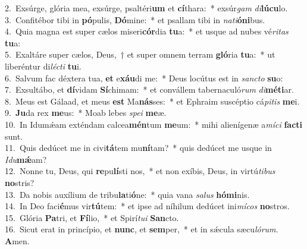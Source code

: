 {2.~}Exsúrge, glória mea, exsúrge, psaltéri\textbf{um} et \textbf{cí}thara:~* exsúr\textit{gam} \textit{di}\textbf{lú}\textbf{cu}lo.\\
{3.~}Confitébor tibi in \textbf{pó}pulis, \textbf{Dó}mine:~* et psallam tibi in \textit{na}\textit{ti}\textbf{ó}\textbf{ni}bus.\\
{4.~}Quia magna est super cælos miseri\textbf{cór}dia \textbf{tu}a:~* et usque ad nubes vé\textit{ri}\textit{tas} \textbf{tu}a:\\
{5.~}Exaltáre super cælos, Deus,~† et super omnem terram \textbf{gló}ria \textbf{tu}a:~* ut liberéntur di\textit{lé}\textit{cti} \textbf{tu}i.\\
{6.~}Salvum fac déxtera tua, \textbf{et} e\textbf{xáu}di me:~* Deus locútus est in \textit{san}\textit{cto} \textbf{su}o:\\
{7.~}Exsultábo, et \textbf{dí}vidam \textbf{Sí}chimam:~* et convállem tabernaculó\textit{rum} \textit{di}\textbf{mé}\textbf{ti}ar.\\
{8.~}Meus est Gálaad, et meus \textbf{est} Ma\textbf{nás}ses:~* et Ephraim suscéptio cá\textit{pi}\textit{tis} \textbf{me}i.\\
{9.~}\textbf{Ju}da rex \textbf{me}us:~* Moab lebes \textit{spe}\textit{i} \textbf{me}æ.\\
{10.~}In Idumǽam exténdam calcea\textbf{mén}tum \textbf{me}um:~* mihi alienígenæ a\textit{mí}\textit{ci} \textbf{fa}\textbf{cti} sunt.\\
{11.~}Quis dedúcet me in civi\textbf{tá}tem mu\textbf{ní}tam?~* quis dedúcet me usque in \textit{I}\textit{du}\textbf{mǽ}am?\\
{12.~}Nonne tu, Deus, qui \textbf{re}pu\textbf{lí}sti nos,~* et non exíbis, Deus, in virtú\textit{ti}\textit{bus} \textbf{no}stris?\\
{13.~}Da nobis auxílium de tribu\textbf{la}ti\textbf{ó}ne:~* quia vana \textit{sa}\textit{lus} \textbf{hó}\textbf{mi}nis.\\
{14.~}In Deo faci\textbf{é}mus vir\textbf{tú}tem:~* et ipse ad níhilum dedúcet ini\textit{mí}\textit{cos} \textbf{no}stros.\\
{15.~}Glória \textbf{Pa}tri, et \textbf{Fí}lio,~* et Spirí\textit{tu}\textit{i} \textbf{San}cto.\\
{16.~}Sicut erat in princípio, et \textbf{nunc}, et \textbf{sem}per,~* et in sǽcula sæcu\textit{ló}\textit{rum}. \textbf{A}men.\\
